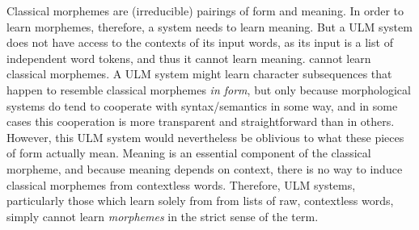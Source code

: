 Classical morphemes are (irreducible) pairings of form and meaning.
In order to learn morphemes, therefore, a system needs to learn meaning. But a ULM system does not have access to
the contexts of its input words, as its input is a list of independent word tokens, and thus it cannot learn
meaning.
cannot learn classical morphemes. 
A \ac{ULM} system might learn 
character subsequences that happen to resemble
 classical morphemes \emph{in form}, but only because morphological systems
do tend to cooperate with syntax/semantics in some way, and in some 
 cases this cooperation is more transparent and straightforward than
 in others.  However, this \ac{ULM} system would nevertheless be oblivious to what
 these pieces of form actually mean. Meaning is an essential component of the classical morpheme, and because
 meaning depends on context, there is no way to induce classical morphemes from contextless words.
Therefore, \ac{ULM} systems, particularly those which learn solely from 
from lists of raw, contextless words, simply cannot learn 
\emph{morphemes} in the strict sense of the term.

